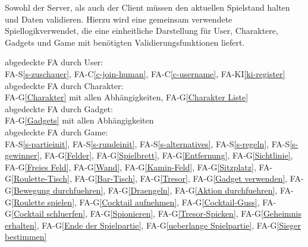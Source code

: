 Sowohl der Server, als auch der Client müssen den aktuellen Spielstand halten und Daten validieren. Hierzu wird eine gemeinsam verwendete \glqq Spiellogik\grqq verwendet, die eine einheitliche Darstellung für User, Charaktere, Gadgets und Game mit benötigten Validierungsfunktionen liefert.\\
\newline
abgedeckte FA durch User:\\
FA-S\ref{s-zuschauer}, FA-C\ref{c-join-human}, FA-C\ref{c-username}, FA-KI\ref{ki-register}\\
abgedeckte FA durch Charakter:\\
FA-G\ref{Charakter} mit allen Abhängigkeiten, FA-G\ref{Charakter Liste}\\
abgedeckte FA durch Gadget:\\
FA-G\ref{Gadgets} mit allen Abhängigkeiten\\
abgedeckte FA durch Game:\\
FA-S\ref{s-partieinit}, FA-S\ref{s-rundeinit}, FA-S\ref{s-alternatives}, FA-S\ref{s-regeln}, FA-S\ref{s-gewinner}, FA-G\ref{Felder}, FA-G\ref{Spielbrett}, FA-G\ref{Entfernung}, FA-G\ref{Sichtlinie}, FA-G\ref{Freies Feld}, FA-G\ref{Wand}, FA-G\ref{Kamin-Feld}, FA-G\ref{Sitzplatz}, FA-G\ref{Roulette-Tisch}, FA-G\ref{Bar-Tisch}, FA-G\ref{Tresor}, FA-G\ref{Gadget verwenden}, FA-G\ref{Bewegung durchfuehren}, FA-G\ref{Draengeln}, FA-G\ref{Aktion durchfuehren}, FA-G\ref{Roulette spielen}, FA-G\ref{Cocktail aufnehmen}, FA-G\ref{Cocktail-Guss}, FA-G\ref{Cocktail schluerfen}, FA-G\ref{Spionieren}, FA-G\ref{Tresor-Spicken}, FA-G\ref{Geheimnis erhalten}, FA-G\ref{Ende der Spielpartie}, FA-G\ref{ueberlange Spielpartie}, FA-G\ref{Sieger bestimmen}\\


